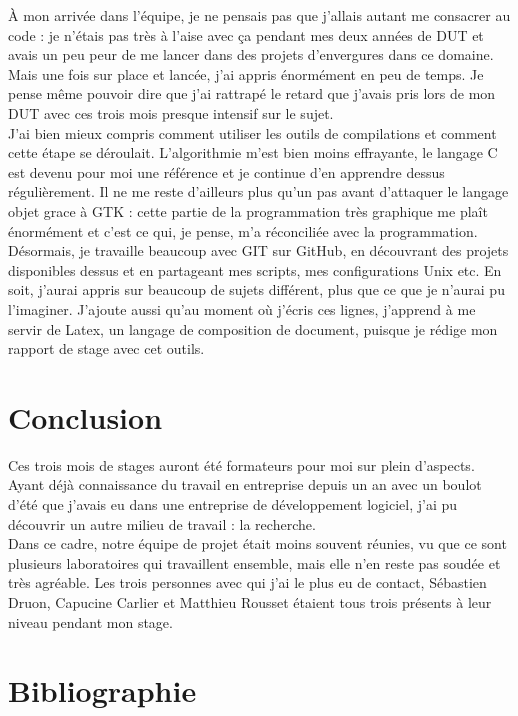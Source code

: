 \documentclass[11pt,french,a4paper]{report}
\begin{document}
À mon arrivée dans l'équipe, je ne pensais pas que j'allais autant me consacrer au code : je n'étais pas très à l'aise avec ça 
pendant mes deux années de DUT et avais un peu peur de me lancer dans des projets d'envergures dans ce domaine. 
Mais une fois sur place et lancée, j'ai appris énormément en peu de temps. Je pense même pouvoir dire que j'ai rattrapé le retard 
que j'avais pris lors de mon DUT avec ces trois mois presque intensif sur le sujet. \\
J'ai bien mieux compris comment utiliser les outils de compilations et comment cette étape se déroulait. L'algorithmie m'est bien moins
effrayante, le langage C est devenu pour moi une référence et je continue d'en apprendre dessus régulièrement. 
Il ne me reste d'ailleurs plus qu'un pas avant d'attaquer le langage objet grace à GTK : cette partie de la programmation très graphique
me plaît énormément et c'est ce qui, je pense, m'a réconciliée avec la programmation. \\
Désormais, je travaille beaucoup avec GIT sur GitHub, en découvrant des projets disponibles dessus et en partageant mes scripts,
mes configurations Unix etc. 
En soit, j'aurai appris sur beaucoup de sujets différent, plus que ce que je n'aurai pu l'imaginer.
J'ajoute aussi qu'au moment où j'écris ces lignes, j'apprend à me servir de Latex, un langage de composition de document, 
puisque je rédige mon rapport de stage avec cet outils. 

\chapter{Conclusion}
Ces trois mois de stages auront été formateurs pour moi sur plein d'aspects. Ayant déjà connaissance du travail en entreprise depuis un an
avec un boulot d'été que j'avais eu dans une entreprise de développement logiciel, j'ai pu découvrir un autre milieu de travail : 
la recherche. \\
Dans ce cadre, notre équipe de projet était moins souvent réunies, vu que ce sont plusieurs laboratoires qui travaillent ensemble, 
mais elle n'en reste pas soudée et très agréable. Les trois personnes avec qui j'ai le plus eu de contact, Sébastien Druon, 
Capucine Carlier et Matthieu Rousset étaient tous trois présents à leur niveau pendant mon stage.  \\

\chapter{Bibliographie}
\end{document}
